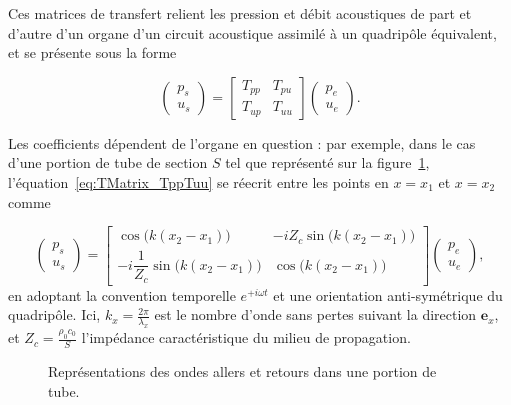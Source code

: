 Ces matrices de transfert relient les pression et débit acoustiques de part et d'autre d'un organe d'un circuit acoustique assimilé à un quadripôle équivalent, et se présente sous la forme

\begin{equation}
    \begin{pmatrix}
        p_s\\
        u_s
    \end{pmatrix}=\begin{bmatrix}
        T_{pp} & T_{pu} \\
        T_{up} & T_{uu}
    \end{bmatrix}\begin{pmatrix}
        p_e\\
        u_e
    \end{pmatrix}.
    \label{eq:TMatrix_TppTuu}
\end{equation}

Les coefficients dépendent de l'organe en question : par exemple, dans le cas d'une portion de tube de section $S$ tel que représenté sur la figure~\ref{fig:WavesInDuctPiece}, l'équation~\eqref{eq:TMatrix_TppTuu} se réecrit entre les points en $x=x_1$ et $x=x_2$ comme

\begin{equation}
    \begin{pmatrix}
        p_s\\
        u_s
    \end{pmatrix}=\begin{bmatrix}
        \cos\big(k(x_2-x_1)\big) & - i Z_c \sin\big(k(x_2-x_1)\big)\\
        - i \dfrac{1}{Z_c} \sin\big(k(x_2-x_1)\big) & \cos\big(k(x_2-x_1)\big)
    \end{bmatrix}\begin{pmatrix}
        p_e\\
        u_e
    \end{pmatrix},
    \label{eq:TMatrixCosSin}
\end{equation}
en adoptant la convention temporelle $e^{+i\omega t}$ et une orientation anti-symétrique du quadripôle. Ici, $k_x = \frac{2\pi}{\lambda_x}$ est le nombre d'onde sans pertes suivant la direction $\mathbf e_x$, et $Z_c = \frac{\rho_0 c_0}{S}$ l'impédance caractéristique du milieu de propagation. 

\begin{figure}[!ht]
    \centering
    
    \caption{Représentations des ondes allers et retours dans une portion de tube.}%
    \label{fig:WavesInDuctPiece}
\end{figure}



